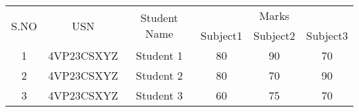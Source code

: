 \documentclass{article}
\begin{document}
	\begin{table}[h]
			\begin{tabular}{|c|c|c|ccc|}
				\hline
				\multirow{2}{*}{S.NO} & \multirow{2}{*}{USN} &\multirow{2}{*}{Student Name} &\multicolumn{3}{c|}{Marks}\\
				\cline{4-6}
				&			& 			&
				\multicolumn{1}{c|}{Subject1} & \multicolumn{1}{c|}{Subject2} & 
				Subject3\\
				\hline
				1 & 4VP23CSXYZ & Student 1 & \multicolumn{1}{c|}{80} &
				\multicolumn{1}{c|}{90} &
				70\\
				\hline
					2 & 4VP23CSXYZ & Student 2 & \multicolumn{1}{c|}{80} &
				\multicolumn{1}{c|}{70} &
				90\\
				\hline
					3 & 4VP23CSXYZ & Student 3 & \multicolumn{1}{c|}{60} &
				\multicolumn{1}{c|}{75} &
				70\\
				\hline
	 		\end{tabular}
	\end{table}
\end{document}
